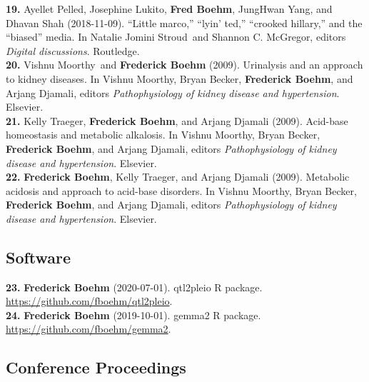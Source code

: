 \documentclass[
  10pt,
]
{article}
\begin{document}
\textbf{19.} \normalsize \normalsize Ayellet Pelled\normalsize ,
\normalsize Josephine Lukito\normalsize ,
\textbf{\normalsize Fred Boehm}\normalsize , \normalsize JungHwan
Yang\normalsize , and \normalsize Dhavan Shah (2018-11-09). ``Little
marco,'' ``lyin' ted,'' ``crooked hillary,'' and the ``biased'' media.
In \normalsize Natalie Jomini Stroud\normalsize ~and \normalsize Shannon
C. McGregor, editors \emph{Digital discussions}. Routledge.\\
\textbf{20.} \normalsize \normalsize Vishnu Moorthy\normalsize ~and
\textbf{\normalsize Frederick Boehm} (2009). Urinalysis and an approach
to kidney diseases. In \normalsize Vishnu Moorthy\normalsize ,
\normalsize Bryan Becker\normalsize ,
\textbf{\normalsize Frederick Boehm}\normalsize , and \normalsize Arjang
Djamali, editors \emph{Pathophysiology of kidney disease and
hypertension}. Elsevier.\\
\textbf{21.} \normalsize \normalsize Kelly Traeger\normalsize ,
\textbf{\normalsize Frederick Boehm}\normalsize , and \normalsize Arjang
Djamali (2009). Acid-base homeostasis and metabolic alkalosis. In
\normalsize Vishnu Moorthy\normalsize , \normalsize Bryan
Becker\normalsize , \textbf{\normalsize Frederick Boehm}\normalsize ,
and \normalsize Arjang Djamali, editors \emph{Pathophysiology of kidney
disease and hypertension}. Elsevier.\\
\textbf{22.}
\normalsize \textbf{\normalsize Frederick Boehm}\normalsize ,
\normalsize Kelly Traeger\normalsize , and \normalsize Arjang Djamali
(2009). Metabolic acidosis and approach to acid-base disorders. In
\normalsize Vishnu Moorthy\normalsize , \normalsize Bryan
Becker\normalsize , \textbf{\normalsize Frederick Boehm}\normalsize ,
and \normalsize Arjang Djamali, editors \emph{Pathophysiology of kidney
disease and hypertension}. Elsevier.

\subsection{Software}\label{software}

\textbf{23.} \normalsize \textbf{\normalsize Frederick Boehm}
(2020-07-01). qtl2pleio R package.
\url{https://github.com/fboehm/qtl2pleio}.\\
\textbf{24.} \normalsize \textbf{\normalsize Frederick Boehm}
(2019-10-01). gemma2 R package. \url{https://github.com/fboehm/gemma2}.

\subsection{Conference Proceedings}\label{conference-proceedings}
\end{document}
